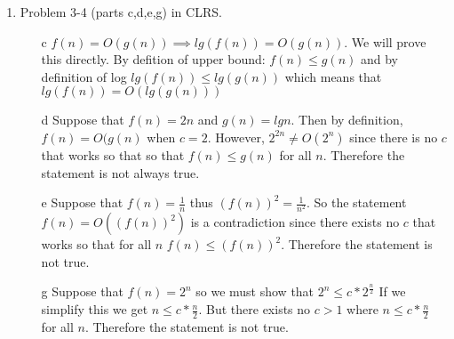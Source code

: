 \documentclass[letterpaper,11pt]{article}
\begin{document}
\begin{enumerate}
\item Problem 3-4 (parts c,d,e,g) in CLRS.
\begin{enumerate}
\item[c]
$f(n) = O(g(n)) \implies lg(f(n)) = O(g(n))$. We will prove this directly.
By defition of upper bound: $f(n) \leq g(n)$ and by definition of log  $lg(f(n)) \leq lg(g(n))$ which means that  $lg(f(n)) = O(lg(g(n)))$ 
\item[d]
Suppose that $f(n) = 2n$ and $g(n) = lg n$. Then by definition, $f(n) = O(g(n)$ when $c = 2$. However, $2^{2n} \neq O(2^{n})$ since there is no $c$ that works so that so that $f(n) \leq g(n)$ for all $n$.  Therefore the statement is not always true.
\item[e]
Suppose that $f(n) = \frac{1}{n}$ thus $(f(n))^2 = \frac{1}{n^2}$. So the statement  $f(n) = O((f(n))^2)$ is a contradiction since there exists no $c$ that works so that for all $n$ $f(n) \leq (f(n))^2$. Therefore the statement is not true.
\item[g]
Suppose that $f(n) = 2^n$  so we must show that $2^n \leq  c*2^{\frac{n}{2}}$ If we simplify this we get $n \leq c*\frac{n}{2}$. But there exists no $c > 1$ where $n \leq c*\frac{n}{2}$ for all $n$. Therefore the statement is not true.
\end{enumerate}
\end{enumerate}
\end{document}
